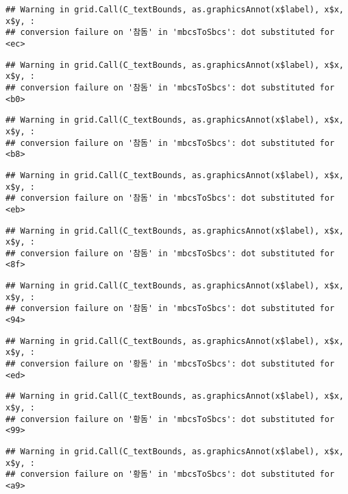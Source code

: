 \documentclass[
]{article}
\begin{document}
\begin{verbatim}
## Warning in grid.Call(C_textBounds, as.graphicsAnnot(x$label), x$x, x$y, :
## conversion failure on '참돔' in 'mbcsToSbcs': dot substituted for <ec>
\end{verbatim}

\begin{verbatim}
## Warning in grid.Call(C_textBounds, as.graphicsAnnot(x$label), x$x, x$y, :
## conversion failure on '참돔' in 'mbcsToSbcs': dot substituted for <b0>
\end{verbatim}

\begin{verbatim}
## Warning in grid.Call(C_textBounds, as.graphicsAnnot(x$label), x$x, x$y, :
## conversion failure on '참돔' in 'mbcsToSbcs': dot substituted for <b8>
\end{verbatim}

\begin{verbatim}
## Warning in grid.Call(C_textBounds, as.graphicsAnnot(x$label), x$x, x$y, :
## conversion failure on '참돔' in 'mbcsToSbcs': dot substituted for <eb>
\end{verbatim}

\begin{verbatim}
## Warning in grid.Call(C_textBounds, as.graphicsAnnot(x$label), x$x, x$y, :
## conversion failure on '참돔' in 'mbcsToSbcs': dot substituted for <8f>
\end{verbatim}

\begin{verbatim}
## Warning in grid.Call(C_textBounds, as.graphicsAnnot(x$label), x$x, x$y, :
## conversion failure on '참돔' in 'mbcsToSbcs': dot substituted for <94>
\end{verbatim}

\begin{verbatim}
## Warning in grid.Call(C_textBounds, as.graphicsAnnot(x$label), x$x, x$y, :
## conversion failure on '황돔' in 'mbcsToSbcs': dot substituted for <ed>
\end{verbatim}

\begin{verbatim}
## Warning in grid.Call(C_textBounds, as.graphicsAnnot(x$label), x$x, x$y, :
## conversion failure on '황돔' in 'mbcsToSbcs': dot substituted for <99>
\end{verbatim}

\begin{verbatim}
## Warning in grid.Call(C_textBounds, as.graphicsAnnot(x$label), x$x, x$y, :
## conversion failure on '황돔' in 'mbcsToSbcs': dot substituted for <a9>
\end{verbatim}
\end{document}
